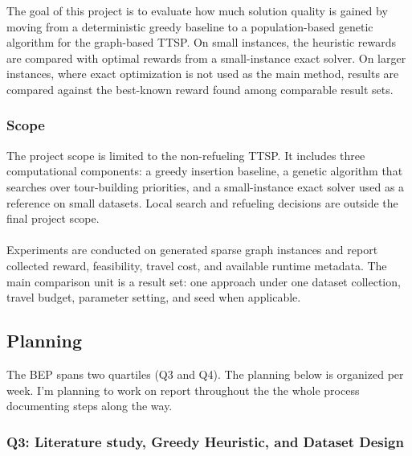 \documentclass[report,english,cleveref,autoref,a4paper]{lipics-v2021}
\newcommand{\explanation}[1]{\emph{Explanation:} #1}
\newcommand{\explanation}[1]{}
\begin{document}
The goal of this project is to evaluate how much solution quality is gained by moving from a deterministic greedy baseline to a population-based genetic algorithm for the graph-based TTSP. On small instances, the heuristic rewards are compared with optimal rewards from a small-instance exact solver. On larger instances, where exact optimization is not used as the main method, results are compared against the best-known reward found among comparable result sets.

\subsubsection{Scope}

The project scope is limited to the non-refueling TTSP. It includes three computational components: a greedy insertion baseline, a genetic algorithm that searches over tour-building priorities, and a small-instance exact solver used as a reference on small datasets. Local search and refueling decisions are outside the final project scope.
\\ \\
Experiments are conducted on generated sparse graph instances and report collected reward, feasibility, travel cost, and available runtime metadata. The main comparison unit is a result set: one approach under one dataset collection, travel budget, parameter setting, and seed when applicable.

\subsection{Planning}
\label{subsec:planning}

The BEP spans two quartiles (Q3 and Q4). The planning below is organized per week. I'm planning to work on report throughout the the whole process documenting steps along the way.

\subsubsection{Q3: Literature study, Greedy Heuristic, and Dataset Design}
\end{document}
